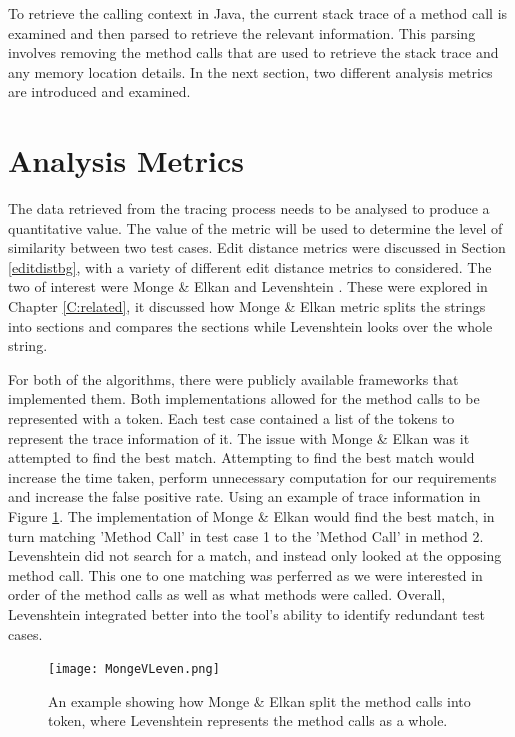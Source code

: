 To retrieve the calling context in Java, the current stack trace of a method call is examined and then parsed to retrieve the relevant information. This parsing involves removing the method calls that are used to retrieve the stack trace and any memory location details.  In the next section, two different analysis metrics are introduced and examined.

\section{Analysis Metrics}
\label{S:metrics}
The data retrieved from the tracing process needs to be analysed to produce a quantitative value. The value of the metric will be used to determine the level of similarity between two test cases. Edit distance metrics were discussed in Section \ref{editdistbg}, with a variety of different edit distance metrics to considered. The two of interest were Monge \& Elkan \cite{monge1997efficient} and Levenshtein \cite{levenshtein1966binary}. These were explored in Chapter \ref{C:related}, it discussed how Monge \& Elkan metric splits the strings into sections and compares the sections while Levenshtein looks over the whole string. 

For both of the algorithms, there were publicly available frameworks that implemented them. Both implementations allowed for the method calls to be represented with a token. Each test case contained a list of the tokens to represent the trace information of it. The issue with Monge \& Elkan was it attempted to find the best match. Attempting to find the best match would increase the time taken, perform unnecessary computation for our requirements and increase the false positive rate. Using an example of trace information in Figure \ref{fig:mongevleven}. The implementation of Monge \& Elkan would find the best match, in turn matching 'Method Call' in test case 1 to the 'Method Call' in method 2. Levenshtein did not search for a match, and instead only looked at the opposing method call. This one to one matching was perferred as we were interested in order of the method calls as well as what methods were called. Overall, Levenshtein integrated better into the tool's ability to identify redundant test cases.

\begin{figure}[h]
\begin{center}
\texttt{[image: MongeVLeven.png]}
\end{center}
\caption{An example showing how Monge \& Elkan split the method calls into token, where Levenshtein represents the method calls as a whole.}
\label{fig:mongevleven}
\end{figure}

